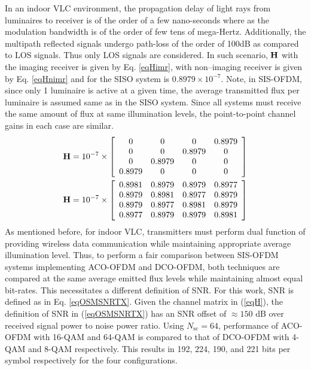 In an indoor VLC environment, the propagation delay of light rays from luminaires to receiver is of the order of a few nano-seconds where as the modulation bandwidth is of the order of few tens of mega-Hertz. Additionally, the multipath reflected signals undergo path-loss of the order of 100dB as compared to LOS signals. Thus only LOS signals are considered. In such scenario, ${\bf{H}}$ with the imaging receiver is given by Eq. \eqref{eqHimr}, with non--imaging receiver is given by Eq. \eqref{eqHnimr} and for the SISO system is $0.8979\times 10^{-7}$. Note, in SIS-OFDM, since only 1 luminaire is active at a given time, the average transmitted flux per luminaire is assumed same as in the SISO system. Since all systems must receive the same amount of flux at same illumination levels, the point-to-point channel gains in each case are similar.
\begin{subequations}
\begin{align}
	{\bf{H}} = 10^{-7}\times\left[
	                      \begin{array}{cccc}
												0&0&0&0.8979\\
												0&0&0.8979&0\\
												0&0.8979&0&0\\
												0.8979&0&0&0
												\end{array}
												\right]\label{eqHimr}\\
	{\bf{H}} = 10^{-7}\times\left[
	                      \begin{array}{cccc}
												0.8981&0.8979&0.8979&0.8977\\
												0.8979&0.8981&0.8977&0.8979\\
												0.8979&0.8977&0.8981&0.8979\\
												0.8977&0.8979&0.8979&0.8981
												\end{array}
												\right]\label{eqHnimr}
\end{align}
\label{eqH}
\end{subequations}
As mentioned before, for indoor VLC, transmitters must perform dual function of providing wireless data communication while maintaining appropriate average illumination level. Thus, to perform a fair comparison between SIS-OFDM systems implementing ACO-OFDM and DCO-OFDM, both techniques are compared at the same average emitted flux levels while maintaining almost equal bit-rates. This necessitates a different definition of SNR. For this work, SNR is defined as in Eq. \eqref{eqOSMSNRTX}. Given the channel matrix in (\ref{eqH}), the definition of SNR in (\ref{eqOSMSNRTX}) has an SNR offset of $\approx 150$ dB over received signal power to noise power ratio. Using $N_{\text{sc}}=64$, performance of ACO-OFDM with 16-QAM and 64-QAM is compared to that of DCO-OFDM with 4-QAM and 8-QAM respectively. This results in 192, 224, 190, and 221 bits per symbol respectively for the four configurations.

